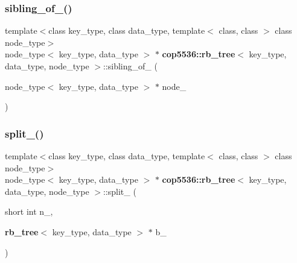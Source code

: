 \subsubsection{sibling\_of\_()}
{\footnotesize\ttfamily template$<$class key\+\_\+type, class data\+\_\+type, template$<$ class, class $>$ class node\+\_\+type$>$ \\
node\+\_\+type$<$ key\+\_\+type, data\+\_\+type $>$ $\ast$ \textbf{ cop5536\+::rb\+\_\+tree}$<$ key\+\_\+type, data\+\_\+type, node\+\_\+type $>$\+::sibling\+\_\+of\+\_\+ (\begin{DoxyParamCaption}\item[{node\+\_\+type$<$ key\+\_\+type, data\+\_\+type $>$ $\ast$}]{node\+\_\+ }\end{DoxyParamCaption})\hspace{0.3cm}{\ttfamily [inline]}}

\mbox{\label{classcop5536_1_1rb__tree_a151086d7353f49ad234479f032bac486}} 
\subsubsection{split\_()\hspace{0.1cm}{\footnotesize\ttfamily [1/2]}}
{\footnotesize\ttfamily template$<$class key\+\_\+type, class data\+\_\+type, template$<$ class, class $>$ class node\+\_\+type$>$ \\
node\+\_\+type$<$ key\+\_\+type, data\+\_\+type $>$ $\ast$ \textbf{ cop5536\+::rb\+\_\+tree}$<$ key\+\_\+type, data\+\_\+type, node\+\_\+type $>$\+::split\+\_\+ (\begin{DoxyParamCaption}\item[{short int}]{n\+\_\+,  }\item[{\textbf{ rb\+\_\+tree}$<$ key\+\_\+type, data\+\_\+type $>$ $\ast$}]{b\+\_\+ }\end{DoxyParamCaption})\hspace{0.3cm}{\ttfamily [inline]}}

